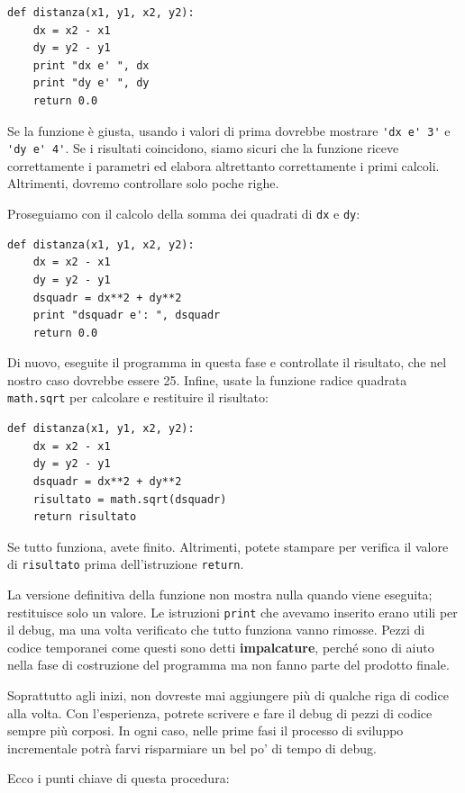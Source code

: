 \documentclass[10pt]{book}
\begin{document}
\begin{verbatim}
def distanza(x1, y1, x2, y2):
    dx = x2 - x1
    dy = y2 - y1
    print "dx e' ", dx
    print "dy e' ", dy
    return 0.0
\end{verbatim}
%
Se la funzione è giusta, usando i valori di prima dovrebbe mostrare \verb"'dx e' 3'" e \verb"'dy e' 4'". Se i risultati coincidono, siamo sicuri che la funzione riceve correttamente i parametri ed elabora altrettanto correttamente i primi calcoli. Altrimenti, dovremo controllare solo poche righe.

Proseguiamo con il calcolo della somma dei quadrati di {\tt dx} e {\tt dy}:

\begin{verbatim}
def distanza(x1, y1, x2, y2):
    dx = x2 - x1
    dy = y2 - y1
    dsquadr = dx**2 + dy**2
    print "dsquadr e': ", dsquadr
    return 0.0
\end{verbatim}
%
Di nuovo, eseguite il programma in questa fase e controllate il risultato, che nel nostro caso dovrebbe essere 25.
Infine, usate la funzione radice quadrata {\tt math.sqrt} per calcolare e restituire il risultato:

\begin{verbatim}
def distanza(x1, y1, x2, y2):
    dx = x2 - x1
    dy = y2 - y1
    dsquadr = dx**2 + dy**2
    risultato = math.sqrt(dsquadr)
    return risultato
\end{verbatim}
%
Se tutto funziona, avete finito. Altrimenti, potete stampare per verifica il valore di {\tt risultato} prima dell'istruzione {\tt return}.

La versione definitiva della funzione non mostra nulla quando viene eseguita; restituisce solo un valore. Le istruzioni {\tt print} che avevamo inserito erano utili per il debug, ma una volta verificato che tutto funziona vanno rimosse. Pezzi di codice temporanei come questi sono detti {\bf impalcature}, perché sono di aiuto nella fase di costruzione del programma ma non fanno parte del prodotto finale. 

Soprattutto agli inizi, non dovreste mai aggiungere più di qualche riga
di codice alla volta. Con l'esperienza, potrete scrivere e fare il debug di pezzi di codice sempre più corposi. In ogni caso, nelle prime fasi il processo di sviluppo incrementale potrà farvi risparmiare un bel po' di tempo di debug.

Ecco i punti chiave di questa procedura:
\end{document}

